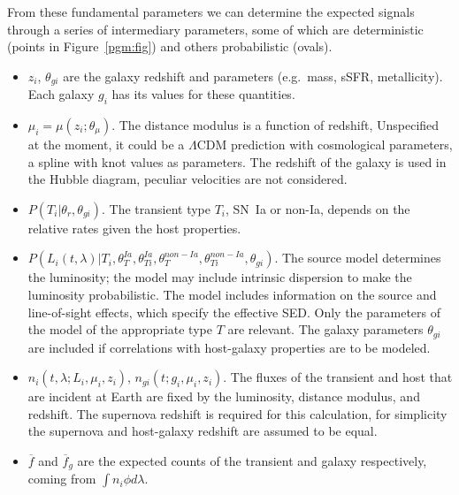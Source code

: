 \documentclass[preprint,3p]{elsarticle}
\begin{document}
From these fundamental parameters we can determine the expected
signals
through a series of intermediary parameters,
some of which are deterministic (points in Figure~\ref{pgm:fig}) and others
probabilistic (ovals).
\begin{itemize}
\item $z_i$, $\theta_{gi}$ are the galaxy redshift and parameters (e.g.\ mass, sSFR, metallicity).
Each galaxy $g_i$ has its values for these quantities.
\item $\mu_i=\mu(z_i; \theta_\mu)$.  The distance modulus is a function of redshift,
Unspecified at the moment,  it could
be a $\Lambda$CDM prediction with cosmological parameters, a spline with knot values
as parameters.
The redshift of the galaxy is used in the Hubble diagram, peculiar velocities are not considered.
\item $P(T_i | \theta_r, \theta_{gi})$.  The transient type $T_i$, SN~Ia or non-Ia, depends
on the relative rates given the host properties.
\item $P(L_i(t,\lambda)| T_i, \theta_T^{Ia}, \theta_{Ti}^{Ia}, \theta_T^{\mathit{non-Ia}}, \theta_{Ti}^{\mathit{non-Ia}},
\theta_{gi})$.  The source model determines
the luminosity; the model may include intrinsic dispersion to make the luminosity
probabilistic. The  model includes  information on the
source and line-of-sight effects, which specify the effective SED.   Only the
parameters of the model of the appropriate type $T$ are relevant.  The galaxy parameters
$\theta_{gi}$ are included if correlations with host-galaxy properties are to be modeled.
\item $n_i(t,\lambda; L_i, \mu_i, z_i)$, $n_{gi}(t; g_i, \mu_i, z_i)$.  The  fluxes of
the transient and host that are incident at Earth
are fixed by the luminosity, distance modulus, and redshift.
The supernova redshift is required for this calculation,
for simplicity the supernova and host-galaxy redshift are assumed to be equal.
\item $\overline{f}$ and
$\overline{f}_g$ are the expected counts of the transient and galaxy respectively,
coming from $\int n_i \phi d\lambda$.  
\end{itemize}
\end{document}
